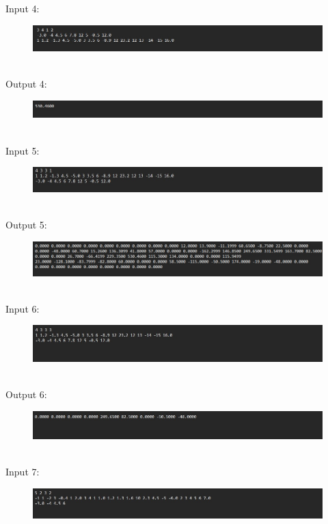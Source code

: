 \documentclass[a4paper]{article}
\begin{document}
Input 4:
\begin{figure}[!h]
	\centering
	\includegraphics[scale=0.5]{Images/i4.jpg}
	\end{figure}\\
Output 4:
\begin{figure}[!h]
	\centering
	\includegraphics[scale=0.5]{Images/o4.jpg}
	\end{figure}\\
Input 5:
\begin{figure}[!h]
	\centering
	\includegraphics[scale=0.5]{Images/i5.jpg}
	\end{figure}\\
Output 5:
\begin{figure}[!h]
	\centering
	\includegraphics[scale=0.5]{Images/o5.jpg}
	\end{figure}\\
Input 6:
\begin{figure}[!h]
	\centering
	\includegraphics[scale=0.5]{Images/i6.jpg}
	\end{figure}\\
Output 6:
\begin{figure}[!h]
	\centering
	\includegraphics[scale=0.5]{Images/o6.jpg}
	\end{figure}\\
Input 7:
\begin{figure}[!h]
	\centering
	\includegraphics[scale=0.5]{Images/i7.jpg}
	\end{figure}\\
\end{document}
